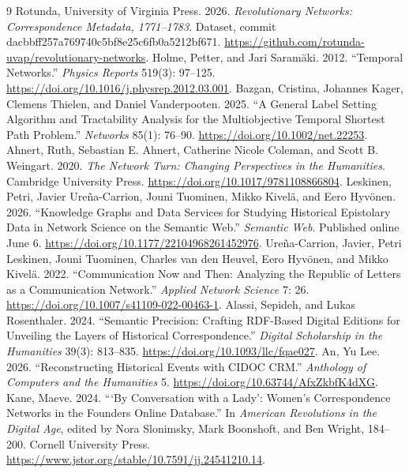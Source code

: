 \documentclass[11pt]{article}
\begin{document}
\begin{thebibliography}{9}\small
{} Rotunda, University of Virginia Press. 2026. \emph{Revolutionary Networks: Correspondence Metadata, 1771--1783}. Dataset, commit dacbbff257a769740c5bf8e25c6fb0a5212bf671. \url{https://github.com/rotunda-uvap/revolutionary-networks}.
 Holme, Petter, and Jari Saram\"aki. 2012. ``Temporal Networks.'' \emph{Physics Reports} 519(3): 97--125. \url{https://doi.org/10.1016/j.physrep.2012.03.001}.
 Bazgan, Cristina, Johannes Kager, Clemens Thielen, and Daniel Vanderpooten. 2025. ``A General Label Setting Algorithm and Tractability Analysis for the Multiobjective Temporal Shortest Path Problem.'' \emph{Networks} 85(1): 76--90. \url{https://doi.org/10.1002/net.22253}.
 Ahnert, Ruth, Sebastian E. Ahnert, Catherine Nicole Coleman, and Scott B. Weingart. 2020. \emph{The Network Turn: Changing Perspectives in the Humanities}. Cambridge University Press. \url{https://doi.org/10.1017/9781108866804}.
 Leskinen, Petri, Javier Ure\~na-Carrion, Jouni Tuominen, Mikko Kivel\"a, and Eero Hyv\"onen. 2026. ``Knowledge Graphs and Data Services for Studying Historical Epistolary Data in Network Science on the Semantic Web.'' \emph{Semantic Web}. Published online June 6. \url{https://doi.org/10.1177/22104968261452976}.
 Ure\~na-Carrion, Javier, Petri Leskinen, Jouni Tuominen, Charles van den Heuvel, Eero Hyv\"onen, and Mikko Kivel\"a. 2022. ``Communication Now and Then: Analyzing the Republic of Letters as a Communication Network.'' \emph{Applied Network Science} 7: 26. \url{https://doi.org/10.1007/s41109-022-00463-1}.
 Alassi, Sepideh, and Lukas Rosenthaler. 2024. ``Semantic Precision: Crafting RDF-Based Digital Editions for Unveiling the Layers of Historical Correspondence.'' \emph{Digital Scholarship in the Humanities} 39(3): 813--835. \url{https://doi.org/10.1093/llc/fqae027}.
 An, Yu Lee. 2026. ``Reconstructing Historical Events with CIDOC CRM.'' \emph{Anthology of Computers and the Humanities} 5. \url{https://doi.org/10.63744/AfxZkbfK4dXG}.
 Kane, Maeve. 2024. ```By Conversation with a Lady': Women's Correspondence Networks in the Founders Online Database.'' In \emph{American Revolutions in the Digital Age}, edited by Nora Slonimsky, Mark Boonshoft, and Ben Wright, 184--200. Cornell University Press. \url{https://www.jstor.org/stable/10.7591/jj.24541210.14}.
\end{thebibliography}

\clearpage\appendix
\end{document}
